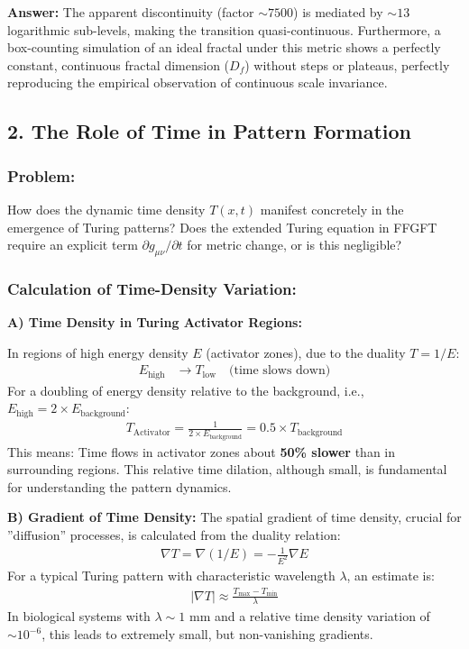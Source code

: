 \documentclass[12pt,a4paper]{article}
\begin{document}
	\textbf{Answer:} The apparent discontinuity (factor $\sim 7500$) is mediated by $\sim 13$ logarithmic sub-levels, making the transition quasi-continuous. Furthermore, a box-counting simulation of an ideal fractal under this metric shows a perfectly constant, continuous fractal dimension ($D_f$) without steps or plateaus, perfectly reproducing the empirical observation of continuous scale invariance.
	
	\subsection*{2. The Role of Time in Pattern Formation}
	
	\subsubsection*{Problem:}
	How does the dynamic time density $T(x,t)$ manifest concretely in the emergence of Turing patterns? Does the extended Turing equation in FFGFT require an explicit term $\partial g_{\mu\nu}/\partial t$ for metric change, or is this negligible?
	
	\subsubsection*{Calculation of Time-Density Variation:}
	
	\textbf{A) Time Density in Turing Activator Regions:}
	
	In regions of high energy density $E$ (activator zones), due to the duality $T = 1/E$:
	\begin{align*}
		E_{\text{high}} &\rightarrow T_{\text{low}} \quad \text{(time slows down)}
	\end{align*}
	For a doubling of energy density relative to the background, i.e., $E_{\text{high}} = 2 \times E_{\text{background}}$:
	\begin{align*}
		T_{\text{Activator}} = \frac{1}{2 \times E_{\text{background}}} = 0.5 \times T_{\text{background}}
	\end{align*}
	This means: Time flows in activator zones about \textbf{50\% slower} than in surrounding regions. This relative time dilation, although small, is fundamental for understanding the pattern dynamics.
	
	\textbf{B) Gradient of Time Density:}
	The spatial gradient of time density, crucial for ''diffusion'' processes, is calculated from the duality relation:
	\begin{align*}
		\nabla T = \nabla(1/E) = -\frac{1}{E^2} \nabla E
	\end{align*}
	For a typical Turing pattern with characteristic wavelength $\lambda$, an estimate is:
	\begin{align*}
		|\nabla T| \approx \frac{T_{\text{max}} - T_{\text{min}}}{\lambda}
	\end{align*}
	In biological systems with $\lambda \sim 1$ mm and a relative time density variation of $\sim 10^{-6}$, this leads to extremely small, but non-vanishing gradients.
	
\end{document}
